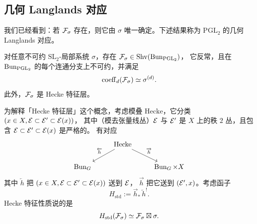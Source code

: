 \subsection{几何 Langlands 对应}

我们已经看到：若 \(\mathcal{F}_\sigma\) 存在，则它由 \(\sigma\) 唯一确定。下述结果称为 \(\mathrm{PGL}_2\) 的几何 Langlands 对应。

\begin{theorem}\label{thm:gl2}
对任意不可约 \(\mathrm{SL}_2\)-局部系统 \(\sigma\)，存在 \(\mathcal{F}_\sigma\in\operatorname{Shv}(\operatorname{Bun}_{\mathrm{PGL}_2})\)，
它反常，且在 \(\operatorname{Bun}_{\mathrm{PGL}_2}\) 的每个连通分支上不可约，并满足
\[
\operatorname{coeff}_d(\mathcal{F}_\sigma)\simeq\sigma^{(d)}.
\]
此外，\(\mathcal{F}_\sigma\) 是 Hecke 特征层。
\end{theorem}

为解释「Hecke 特征层」这个概念，考虑模叠 \(\mathrm{Hecke}\)，它分类 \((x\in X,\mathcal{E}\subset\mathcal{E}'\subset\mathcal{E}(x))\)，
其中（模去张量线丛）\(\mathcal{E}\) 与 \(\mathcal{E}'\) 是 \(X\) 上的秩 \(2\) 丛，且包含 \(\mathcal{E}\subset\mathcal{E}'\subset\mathcal{E}(x)\) 是严格的。
有对应
\[
\begin{tikzcd}
& \mathrm{Hecke} \arrow[dl,"\overleftarrow{h}"'] \arrow[dr,"\overrightarrow{h}"] & \\
\Bun_G & & \Bun_G\times X
\end{tikzcd}
\]
其中 \(\overleftarrow{h}\) 把 \((x\in X,\mathcal{E}\subset\mathcal{E}'\subset\mathcal{E}(x))\) 送到 \(\mathcal{E}\)，
\(\overrightarrow{h}\) 把它送到 \((\mathcal{E}',x)\)。考虑函子
\begin{equation}\label{eq:3.2}
H_{\mathrm{std}}:=\overrightarrow{h}_*\,\overleftarrow{h}^!.
\end{equation}
Hecke 特征性质说的是
\begin{equation}\label{eq:3.3}
H_{\mathrm{std}}(\mathcal{F}_\sigma)\simeq\mathcal{F}_\sigma\boxtimes\sigma.
\end{equation}
